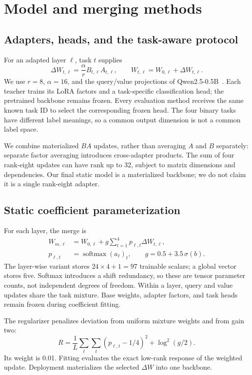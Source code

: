 \documentclass[11pt,a4paper]{article}
\begin{document}
\section{Model and merging methods}
\subsection{Adapters, heads, and the task-aware protocol}
For an adapted layer $\ell$, task $t$ supplies
\begin{equation}
 \Delta W_{t,\ell}=\frac{\alpha}{r}B_{t,\ell}A_{t,\ell},\qquad
 W_{t,\ell}=W_{0,\ell}+\Delta W_{t,\ell}.
\end{equation}
We use $r=8$, $\alpha=16$, and the query/value projections of Qwen2.5-0.5B~\cite{qwen}. Each teacher trains its LoRA factors and a task-specific classification head; the pretrained backbone remains frozen. Every evaluation method receives the same known task ID to select the corresponding frozen head. The four binary tasks have different label meanings, so a common output dimension is not a common label space.

We combine materialized $BA$ updates, rather than averaging $A$ and $B$ separately: separate factor averaging introduces cross-adapter products. The sum of four rank-eight updates can have rank up to 32, subject to matrix dimensions and dependencies. Our final static model is a materialized backbone; we do not claim it is a single rank-eight adapter.

\subsection{Static coefficient parameterization}
For each layer, the merge is
\begin{align}
 W_{m,\ell}&=W_{0,\ell}+g\sum_{t=1}^{4}p_{\ell,t}\Delta W_{t,\ell},\\
 p_{\ell,t}&=\operatorname{softmax}(a_\ell)_t,\qquad
 g=0.5+3.5\,\sigma(b).
\end{align}
The layer-wise variant stores $24\times4+1=97$ trainable scalars; a global vector stores five. Softmax introduces a shift redundancy, so these are tensor parameter counts, not independent degrees of freedom. Within a layer, query and value updates share the task mixture. Base weights, adapter factors, and task heads remain frozen during coefficient fitting.

The regularizer penalizes deviation from uniform mixture weights and from gain two:
\begin{equation}
 R=\frac{1}{L}\sum_\ell\sum_t(p_{\ell,t}-1/4)^2+
       \log^2(g/2).
\end{equation}
Its weight is 0.01. Fitting evaluates the exact low-rank response of the weighted update. Deployment materializes the selected $\Delta W$ into one backbone.
\end{document}
